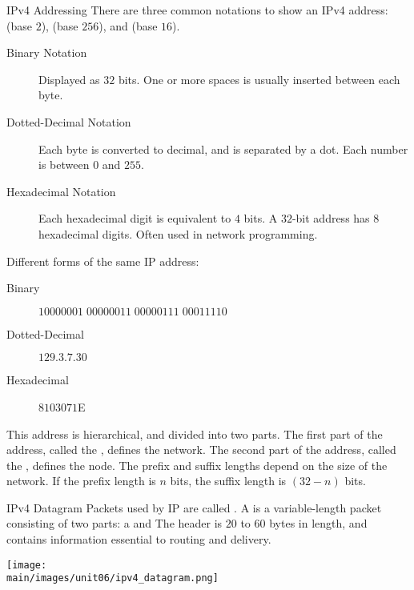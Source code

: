 \documentclass[\main/notes.tex]{subfiles}
\begin{document}
\begin{definition}{IPv4 Addressing}
						There are three common notations to show an IPv4 address:  (base $2$),  (base $256$), and  (base $16$).
						\begin{indentparagraph}
							\begin{description}
								\item[Binary Notation] Displayed as $32$ bits. One or more spaces is usually inserted between each byte.
								\item[Dotted-Decimal Notation] Each byte is converted to decimal, and is separated by a dot. Each number is between $0$ and $255$.
								\item[Hexadecimal Notation] Each hexadecimal digit is equivalent to $4$ bits. A $32$-bit address has $8$ hexadecimal digits. Often used in network programming.
							\end{description}
						\end{indentparagraph}
						\begin{example}
							Different forms of the same IP address:
							\begin{indentparagraph}
								\begin{description}
									\item[Binary] $10000001\;00000011\;00000111\;00011110$
									\item[Dotted-Decimal] $ 129.3.7.30$
									\item[Hexadecimal] $8103071$E
								\end{description}
							\end{indentparagraph}
						\end{example}
						This address is hierarchical, and divided into two parts. The first part of the address, called the , defines the network. The second part of the address, called the , defines the node. The prefix and suffix lengths depend on the size of the network. If the prefix length is $n$ bits, the suffix length is $(32 - n)$ bits.
					\end{definition}
					\pagebreak
					\begin{definition}{IPv4 Datagram}
						Packets used by IP are called . A  is a variable-length packet consisting of two parts: a  and  The header is $20$ to $60$ bytes in length, and contains information essential to routing and delivery.
						\begin{center}
							\texttt{[image: \\main/images/unit06/ipv4\_datagram.png]}
						\end{center}
					\end{definition}
\end{document}
